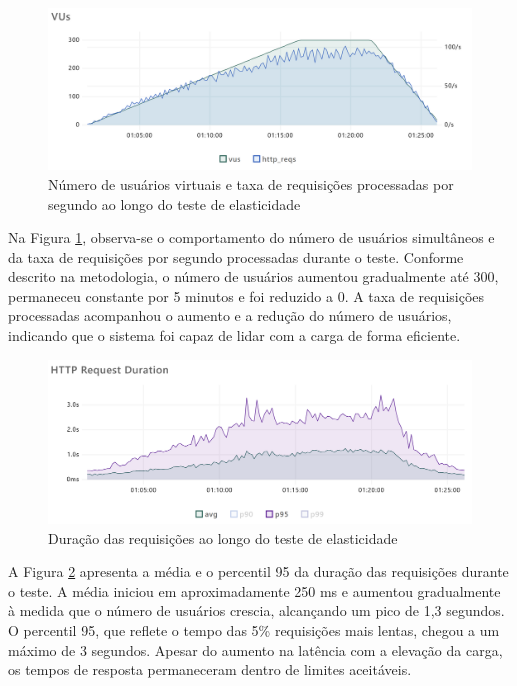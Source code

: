 \begin{figure}[H]
    \centering
    \includegraphics[width=1\textwidth]{assets/elasticity-test/vus-and-reqs.png}
    \caption{Número de usuários virtuais e taxa de requisições processadas por segundo ao longo do teste de elasticidade}
    \label{fig:elasticity-vus-and-reqs}
\end{figure}

Na Figura \ref{fig:elasticity-vus-and-reqs}, observa-se o comportamento do número de usuários simultâneos e da taxa de requisições por segundo processadas durante o teste. Conforme descrito na metodologia, o número de usuários aumentou gradualmente até 300, permaneceu constante por 5 minutos e foi reduzido a 0. A taxa de requisições processadas acompanhou o aumento e a redução do número de usuários, indicando que o sistema foi capaz de lidar com a carga de forma eficiente.

\begin{figure}[H]
    \centering
    \includegraphics[width=1\textwidth]{assets/elasticity-test/req-duration.png}
    \caption{Duração das requisições ao longo do teste de elasticidade}
    \label{fig:elasticity-req-duration}
\end{figure}

A Figura \ref{fig:elasticity-req-duration} apresenta a média e o percentil 95 da duração das requisições durante o teste. A média iniciou em aproximadamente 250 ms e aumentou gradualmente à medida que o número de usuários crescia, alcançando um pico de 1,3 segundos. O percentil 95, que reflete o tempo das 5\% requisições mais lentas, chegou a um máximo de 3 segundos. Apesar do aumento na latência com a elevação da carga, os tempos de resposta permaneceram dentro de limites aceitáveis.

